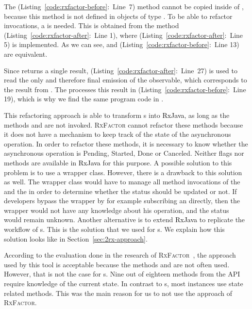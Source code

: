 \documentclass[type=bsc,accentcolor=tud9c]{tudthesis}
\newcommand{\framework}[1]{\textcolor{black}{#1}}
\begin{document}
The  (Listing~\ref{code:rxfactor-before}:~Line~7) method cannot be copied inside of , because this method is not defined in objects of type . To be able to refactor  invocations, a  is needed. This  is obtained from the method  (Listing~\ref{code:rxfactor-after}:~Line 1), where  (Listing~\ref{code:rxfactor-after}:~Line 5) is implemented. As we can see,  and  (Listing~\ref{code:rxfactor-before}:~Line 13) are equivalent. 

Since  returns a single result,  (Listing~\ref{code:rxfactor-after}:~Line~27) is used to read the only and therefore final emission of the observable, which corresponds to the result from . The  processes this result in  (Listing~\ref{code:rxfactor-before}:~Line 19), which is why we find the same program code in .




This refactoring approach is able to transform s into \framework{RxJava}, as long as the methods  and  are not invoked.  \textsc{RxFactor} cannot refactor these methods because it does not have a mechanism to keep track of the state of the asynchronous operation. In order to refactor these methods, it is necessary to know whether the asynchronous operation is Pending, Started, Done or Canceled. Neither flags nor methods are available in \framework{RxJava} for this purpose. A possible solution to this problem is to use a wrapper class. However, there is a drawback to this solution as well. The wrapper class would have to manage all method invocations of the  and the  in order to determine whether the status should be updated or not. If developers bypass the wrapper by for example subscribing an  directly, then the wrapper would not have any knowledge about his operation, and the status would remain unknown. Another alternative is to extend \framework{RxJava} to replicate the workflow of s. This is the solution that we used for s. We explain how this solution looks like in Section~\ref{sec:2rx-approach}.

According to the evaluation done in the research of \textsc{RxFactor}~\cite{thesisRxFactor}, the approach used by this tool is acceptable because the methods  and  are not often used. However, that is not the case for s. Nine out of eighteen methods from the  API require knowledge of the current state. In contrast to s, most  instances use state related methods. This was the main reason for us to not use the approach of \textsc{RxFactor}.
\end{document}
